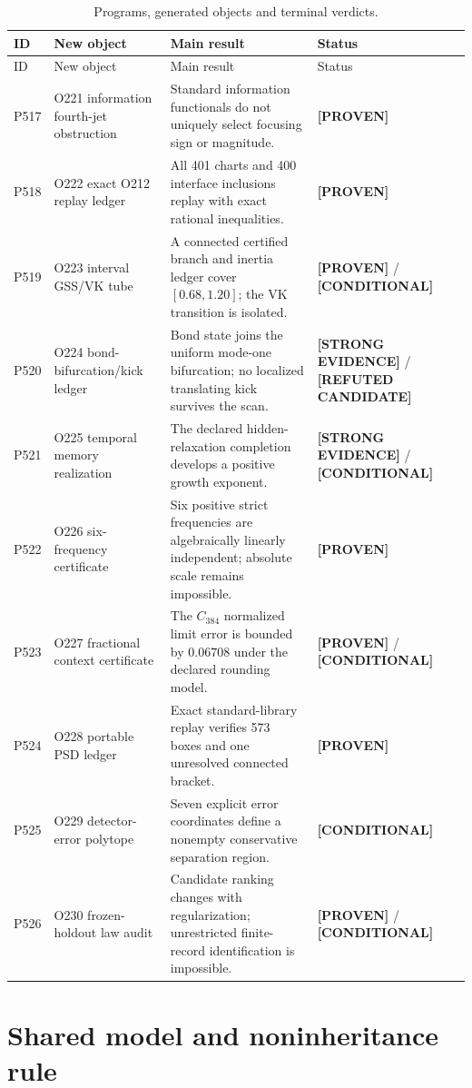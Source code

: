 \documentclass[11pt,a4paper]{article}
\newcommand{\proven}{\textcolor{green!50!black}{\textbf{[PROVEN]}}}
\newcommand{\strong}{\textcolor{blue!70!black}{\textbf{[STRONG EVIDENCE]}}}
\newcommand{\conditional}{\textcolor{black!60}{\textbf{[CONDITIONAL]}}}
\newcommand{\refuted}{\textcolor{red!75!black}{\textbf{[REFUTED CANDIDATE]}}}
\begin{document}
\begin{longtable}{@{}p{}p{}p{}p{}@{}}
\caption{Programs, generated objects and terminal verdicts.}\\
\toprule
ID & New object & Main result & Status\\
\midrule
\endfirsthead
\toprule
ID & New object & Main result & Status\\
\midrule
\endhead
P517 & O221 information fourth-jet obstruction & Standard information functionals do not uniquely select focusing sign or magnitude. & \proven\\
P518 & O222 exact O212 replay ledger & All 401 charts and 400 interface inclusions replay with exact rational inequalities. & \proven\\
P519 & O223 interval GSS/VK tube & A connected certified branch and inertia ledger cover $[0.68,1.20]$; the VK transition is isolated. & \proven{} / \conditional\\
P520 & O224 bond-bifurcation/kick ledger & Bond state joins the uniform mode-one bifurcation; no localized translating kick survives the scan. & \strong{} / \refuted\\
P521 & O225 temporal memory realization & The declared hidden-relaxation completion develops a positive growth exponent. & \strong{} / \conditional\\
P522 & O226 six-frequency certificate & Six positive strict frequencies are algebraically linearly independent; absolute scale remains impossible. & \proven\\
P523 & O227 fractional context certificate & The $C_{384}$ normalized limit error is bounded by $0.06708$ under the declared rounding model. & \proven{} / \conditional\\
P524 & O228 portable PSD ledger & Exact standard-library replay verifies 573 boxes and one unresolved connected bracket. & \proven\\
P525 & O229 detector-error polytope & Seven explicit error coordinates define a nonempty conservative separation region. & \conditional\\
P526 & O230 frozen-holdout law audit & Candidate ranking changes with regularization; unrestricted finite-record identification is impossible. & \proven{} / \conditional\\
\bottomrule
\end{longtable}

\section{Shared model and noninheritance rule}
\end{document}
